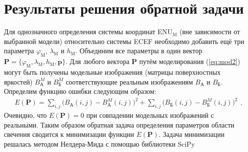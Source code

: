 \documentclass[12pt,a4paper]{article}
\renewcommand{\vec}{\mathbf}
\begin{document}
\section{Результаты решения обратной задачи} \label{sec:inv_problem_results}
Для однозначного определения системы координат ENU$_\text{M}$ (вне зависимости от выбранной модели) относительно системы ECEF необходимо добавить ещё три параметра $\varphi_\text{M}$, $\lambda_\text{M}$ и $h_\text{M}$. Объединим все параметры в один вектор $\vec{P}=\{\varphi_\text{M}, \lambda_\text{M}, h_\text{M}, \vec{p}\}$. Для любого вектора $\vec{P}$ путём моделирования (\ref{eq:mod2}) могут быть получены модельные изображения (матрицы поверхностных яркостей) $B_\text{А}^M$ и $B_\text{Б}^M$ соответствующие реальным изображениям $B_\text{А}$ и $B_\text{Б}$. Определим функцию ошибки следующим образом:
\begin{equation}\label{eq:task1}
\begin{split}
E(\vec{P})=\sum_{i,j}\big(B_{\text{А}}(i,j)-B_{\text{А}}^M(i,j)\big)^2+\sum_{i,j}\big(B_{\text{Б}}(i,j)-B_{\text{Б}}^M(i,j)\big)^2
\end{split}.
\end{equation}
Очевидно, что $E(\vec{P})=0$ при совпадении модельных изображений с реальными. Таким образом обратная задача определения параметров области свечения сводится к минимизации функции $E(\vec{P})$. Задача минимизации решалась методом Нелдера-Мида с помощью библиотеки SciPy \cite{SciPy}
\end{document}
